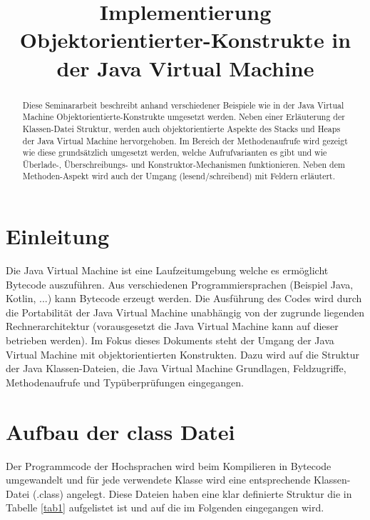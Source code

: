 \documentclass[conference]{IEEEtran}
\begin{document}
\title{Implementierung Objektorientierter-Konstrukte in der Java Virtual Machine\\}

\author{
}

\maketitle

\begin{abstract}
Diese Seminararbeit beschreibt anhand verschiedener Beispiele wie in der Java Virtual Machine Objektorientierte-Konstrukte umgesetzt werden. Neben einer Erläuterung der Klassen-Datei Struktur, werden auch objektorientierte Aspekte des Stacks und Heaps der Java Virtual Machine hervorgehoben. Im Bereich der Methodenaufrufe wird gezeigt wie diese grundsätzlich umgesetzt werden, welche Aufrufvarianten es gibt und wie Überlade-, Überschreibungs- und Konstruktor-Mechanismen funktionieren. Neben dem Methoden-Aspekt wird auch der Umgang (lesend/schreibend) mit Feldern erläutert.
\end{abstract}

\section{Einleitung}
Die Java Virtual Machine ist eine Laufzeitumgebung welche es ermöglicht Bytecode auszuführen. Aus verschiedenen Programmiersprachen (Beispiel Java, Kotlin, ...) kann  Bytecode erzeugt werden. Die Ausführung des Codes wird durch die Portabilität der Java Virtual Machine unabhängig von der zugrunde liegenden Rechnerarchitektur (vorausgesetzt die Java Virtual Machine kann auf dieser betrieben werden). Im Fokus dieses Dokuments steht der Umgang der Java Virtual Machine mit objektorientierten Konstrukten. Dazu wird auf die Struktur der Java Klassen-Dateien, die Java Virtual Machine Grundlagen, Feldzugriffe, Methodenaufrufe und Typüberprüfungen eingegangen.

\section{Aufbau der class Datei}
\label{chKlassenDatei}
Der Programmcode der Hochsprachen wird beim Kompilieren in Bytecode umgewandelt und für jede verwendete Klasse wird eine entsprechende Klassen-Datei (.class) angelegt. Diese Dateien haben eine klar definierte Struktur die in Tabelle \ref{tab1} aufgelistet ist und auf die im Folgenden eingegangen wird.
\end{document}
